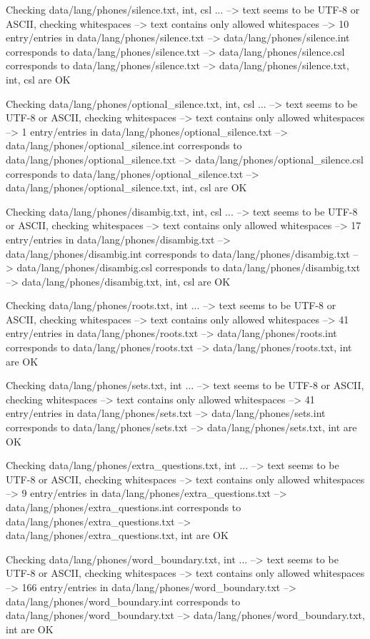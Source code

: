 Checking data/lang/phones/silence.{txt, int, csl} ...
--> text seems to be UTF-8 or ASCII, checking whitespaces
--> text contains only allowed whitespaces
--> 10 entry/entries in data/lang/phones/silence.txt
--> data/lang/phones/silence.int corresponds to data/lang/phones/silence.txt
--> data/lang/phones/silence.csl corresponds to data/lang/phones/silence.txt
--> data/lang/phones/silence.{txt, int, csl} are OK

Checking data/lang/phones/optional_silence.{txt, int, csl} ...
--> text seems to be UTF-8 or ASCII, checking whitespaces
--> text contains only allowed whitespaces
--> 1 entry/entries in data/lang/phones/optional_silence.txt
--> data/lang/phones/optional_silence.int corresponds to data/lang/phones/optional_silence.txt
--> data/lang/phones/optional_silence.csl corresponds to data/lang/phones/optional_silence.txt
--> data/lang/phones/optional_silence.{txt, int, csl} are OK

Checking data/lang/phones/disambig.{txt, int, csl} ...
--> text seems to be UTF-8 or ASCII, checking whitespaces
--> text contains only allowed whitespaces
--> 17 entry/entries in data/lang/phones/disambig.txt
--> data/lang/phones/disambig.int corresponds to data/lang/phones/disambig.txt
--> data/lang/phones/disambig.csl corresponds to data/lang/phones/disambig.txt
--> data/lang/phones/disambig.{txt, int, csl} are OK

Checking data/lang/phones/roots.{txt, int} ...
--> text seems to be UTF-8 or ASCII, checking whitespaces
--> text contains only allowed whitespaces
--> 41 entry/entries in data/lang/phones/roots.txt
--> data/lang/phones/roots.int corresponds to data/lang/phones/roots.txt
--> data/lang/phones/roots.{txt, int} are OK

Checking data/lang/phones/sets.{txt, int} ...
--> text seems to be UTF-8 or ASCII, checking whitespaces
--> text contains only allowed whitespaces
--> 41 entry/entries in data/lang/phones/sets.txt
--> data/lang/phones/sets.int corresponds to data/lang/phones/sets.txt
--> data/lang/phones/sets.{txt, int} are OK

Checking data/lang/phones/extra_questions.{txt, int} ...
--> text seems to be UTF-8 or ASCII, checking whitespaces
--> text contains only allowed whitespaces
--> 9 entry/entries in data/lang/phones/extra_questions.txt
--> data/lang/phones/extra_questions.int corresponds to data/lang/phones/extra_questions.txt
--> data/lang/phones/extra_questions.{txt, int} are OK

Checking data/lang/phones/word_boundary.{txt, int} ...
--> text seems to be UTF-8 or ASCII, checking whitespaces
--> text contains only allowed whitespaces
--> 166 entry/entries in data/lang/phones/word_boundary.txt
--> data/lang/phones/word_boundary.int corresponds to data/lang/phones/word_boundary.txt
--> data/lang/phones/word_boundary.{txt, int} are OK

